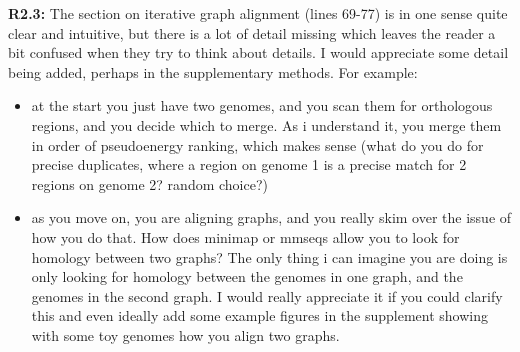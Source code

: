 \documentclass[aps,rmp,onecolumn]{revtex4-1}
\newcommand{\Marco}[1]{{\color{orange}Marco: #1}}
\newcommand{\Liam}[1]{{\color{teal}Liam: #1}}
\newcommand{\reviewer}[2]{\textbf{#1:} #2\vskip 5mm}
\begin{document}
\reviewer{R2.3}{The section on iterative graph alignment (lines 69-77) is in one sense quite clear and intuitive, but there is a lot of detail missing which leaves the reader a bit confused when they try to think about details. I would appreciate some detail being added, perhaps in the supplementary methods. For example:
      \begin{itemize}
            \item at the start you just have two genomes, and you scan them for orthologous regions, and you decide which to merge. As i understand it, you merge them in order of pseudoenergy ranking, which makes sense (what do you do for precise duplicates, where a region on genome 1 is a precise match for 2 regions on genome 2? random choice?)
            \item as you move on, you are aligning graphs, and you really skim over the issue of how you do that. How does minimap or mmseqs allow you to look for homology between two graphs? The only thing i can imagine you are doing is only looking for homology between the genomes in one graph, and the genomes in the second graph. I would really appreciate it if you could clarify this and even ideally add some example figures in the supplement showing with some toy genomes how you align two graphs.
      \end{itemize}}
\end{document}
